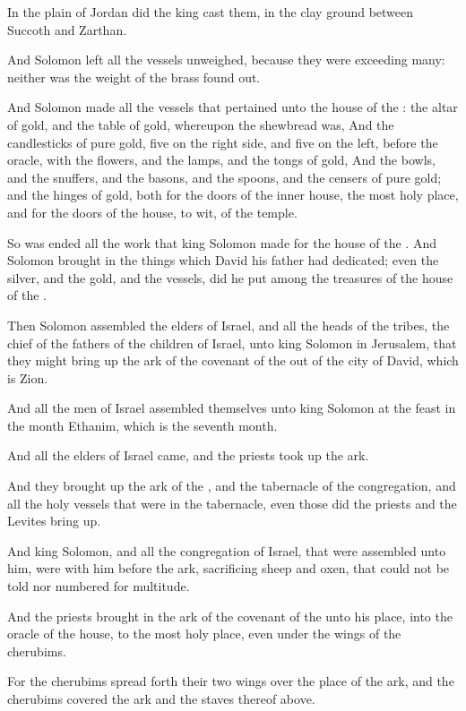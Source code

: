\Verse In the plain of Jordan did the king cast them, in the clay ground between Succoth and Zarthan.

\Verse And Solomon left all the vessels unweighed, because they were exceeding many: neither was the weight of the brass found out.

\Verse And Solomon made all the vessels that pertained unto the house of the \LORD: the altar of gold, and the table of gold, whereupon the shewbread was, \Verse And the candlesticks of pure gold, five on the right side, and five on the left, before the oracle, with the flowers, and the lamps, and the tongs of gold, \Verse And the bowls, and the snuffers, and the basons, and the spoons, and the censers of pure gold; and the hinges of gold, both for the doors of the inner house, the most holy place, and for the doors of the house, to wit, of the temple.

\Verse So was ended all the work that king Solomon made for the house of the \LORD. And Solomon brought in the things which David his father had dedicated; even the silver, and the gold, and the vessels, did he put among the treasures of the house of the \LORD.


\Chapter
\Verse Then Solomon assembled the elders of Israel, and all the heads of the tribes, the chief of the fathers of the children of Israel, unto king Solomon in Jerusalem, that they might bring up the ark of the covenant of the \LORD out of the city of David, which is Zion.

\Verse And all the men of Israel assembled themselves unto king Solomon at the feast in the month Ethanim, which is the seventh month.

\Verse And all the elders of Israel came, and the priests took up the ark.

\Verse And they brought up the ark of the \LORD, and the tabernacle of the congregation, and all the holy vessels that were in the tabernacle, even those did the priests and the Levites bring up.

\Verse And king Solomon, and all the congregation of Israel, that were assembled unto him, were with him before the ark, sacrificing sheep and oxen, that could not be told nor numbered for multitude.

\Verse And the priests brought in the ark of the covenant of the \LORD unto his place, into the oracle of the house, to the most holy place, even under the wings of the cherubims.

\Verse For the cherubims spread forth their two wings over the place of the ark, and the cherubims covered the ark and the staves thereof above.

